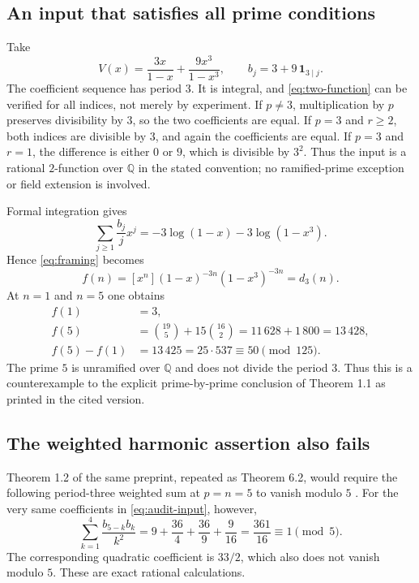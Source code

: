 \documentclass[11pt,a4paper]{article}
\numberwithin{equation}{section}
\theoremstyle{definition}
\theoremstyle{remark}
\newcommand{\Q}{\mathbb Q}
\begin{document}
\subsection{An input that satisfies all prime conditions}

Take
\begin{equation}\label{eq:audit-input}
 V(x)=\frac{3x}{1-x}+\frac{9x^3}{1-x^3},\qquad
 b_j=3+9\,\mathbf1_{3\mid j}.
\end{equation}
The coefficient sequence has period $3$. It is integral, and
\eqref{eq:two-function} can be verified for all indices, not merely by
experiment. If $p\ne3$, multiplication by $p$ preserves divisibility
by $3$, so the two coefficients are equal. If $p=3$ and $r\geq2$,
both indices are divisible by $3$, and again the coefficients are
equal. If $p=3$ and $r=1$, the difference is either $0$ or $9$,
which is divisible by $3^2$. Thus the input is a rational $2$-function
over $\Q$ in the stated convention; no ramified-prime exception or
field extension is involved.

Formal integration gives
\[
 \sum_{j\geq1}\frac{b_j}{j}x^j
  =-3\log(1-x)-3\log(1-x^3).
\]
Hence \eqref{eq:framing} becomes
\[
 f(n)=[x^n](1-x)^{-3n}(1-x^3)^{-3n}=d_3(n).
\]
At $n=1$ and $n=5$ one obtains
\begin{align*}
 f(1)&=3,\\
 f(5)&=\binom{19}{5}+15\binom{16}{2}
       =11\,628+1\,800=13\,428,\\
 f(5)-f(1)&=13\,425=25\cdot537\equiv50\pmod{125}.
\end{align*}
The prime $5$ is unramified over $\Q$ and does not divide the period
$3$. Thus this is a counterexample to the explicit prime-by-prime
conclusion of Theorem 1.1 as printed in the cited version.

\subsection{The weighted harmonic assertion also fails}

Theorem 1.2 of the same preprint, repeated as Theorem 6.2, would require
the following period-three weighted sum at $p=n=5$ to vanish modulo
$5$ \cite{mueller}. For the very same coefficients in
\eqref{eq:audit-input}, however,
\begin{equation}\label{eq:audit-harmonic}
 \sum_{k=1}^{4}\frac{b_{5-k}b_k}{k^2}
 =9+\frac{36}{4}+\frac{36}{9}+\frac9{16}
 =\frac{361}{16}\equiv1\pmod5.
\end{equation}
The corresponding quadratic coefficient is $33/2$, which also does
not vanish modulo $5$. These are exact rational calculations.
\end{document}
